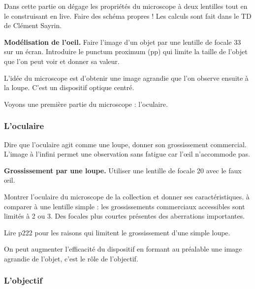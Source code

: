 Dans cette partie on dégage les propriétés du microscope à deux lentilles tout en le construisant en live.
Faire des schéma propres !
Les calculs sont fait dans le TD de Clément Sayrin.

\begin{experience}
\textbf{Modélisation de l'oeil.}
Faire l'image d'un objet par une lentille de focale \unit{33}{\centi\meter} sur un écran.
Introduire le punctum proximum (pp) qui limite la taille de l'objet que l'on peut voir et donner sa valeur.
\end{experience}

L'idée du microscope est d'obtenir une image agrandie que l'on observe ensuite à la loupe.
C'est un dispositif optique centré.

\begin{transition}
Voyons une première partie du microscope : l'oculaire.
\end{transition}

\subsubsection{L'oculaire}

Dire que l'oculaire agit comme une loupe, donner son grossissement commercial.
L'image à l'infini permet une observation sans fatigue car l'œil n'accommode pas.

\begin{experience}
\textbf{Grossissement par une loupe.}
Utiliser une lentille de focale \unit{20}{\centi\meter} avec le faux œil.
\end{experience}

Montrer l'oculaire du microscope de la collection et donner ses caractéristiques.
à comparer à une lentille simple : les grossissements commerciaux accessibles sont limités à 2 ou 3.
Des focales plus courtes présentes des aberrations importantes.

\begin{remarque}
Lire \cite{Hecht2002} p222 pour les raisons qui limitent le grossissement d'une simple loupe.
\end{remarque}

\begin{transition}
On peut augmenter l'efficacité du dispositif en formant au préalable une image agrandie de l'objet, c'est le rôle de l'objectif.
\end{transition}

\subsubsection{L'objectif}

